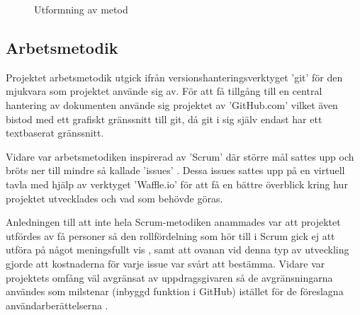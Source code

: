 \begin{figure}[b]
            \label{fig:method}\caption{Utformning av metod}
        \end{figure}


    \newpage

    \subsection{Arbetsmetodik} %
    \label{sub:arbetsmetodik}
        Projektet arbetsmetodik utgick ifrån versionshanteringsverktyget 'git' 
        för den mjukvara som projektet använde sig av. För att få tillgång 
        till en central hantering av dokumenten använde sig projektet av 'GitHub.com' vilket även bistod med ett grafiskt gränssnitt till git, då git i sig själv endast har ett textbaserat gränssnitt. \bigskip

        Vidare var arbetsmetodiken inspirerad av 'Scrum' där större mål sattes upp och bröts ner till mindre så kallade 'issues' \cite[kap.~8]{scrum}. Dessa issues sattes upp på en virtuell tavla med hjälp av verktyget 'Waffle.io' för att få en bättre överblick kring hur projektet utvecklades och vad som behövde göras. \bigskip

        Anledningen till att inte hela Scrum-metodiken anammades var att projektet utfördes av få personer så den rollfördelning som hör till i Scrum gick ej att utföra på något meningsfullt vis \cite[kap.~6]{scrum}, samt att ovanan vid denna typ av utveckling gjorde att kostnaderna för varje issue var svårt att bestämma. Vidare var projektets omfång väl avgränsat av uppdrags\-givaren så de avgränsningarna användes som milstenar (inbyggd funktion i GitHub) istället för de föreslagna användarberättelserna \cite[kap.~9]{scrum}. 

